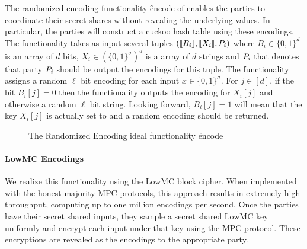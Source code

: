 The randomized encoding functionality \f{encode} of  enables the parties to coordinate their secret shares without revealing the underlying values. In particular, the parties will construct a cuckoo hash table using these encodings. The functionality takes as input several tuples $(\llbracket B_i\rrbracket,\llbracket X_i\rrbracket,P_{i})$ where $B_i\in\{0,1\}^d$ is an array of $d$ bits, $ X_i\in(\{0,1\}^\sigma)^{d}$ is a array of $d$ strings and  $P_{i}$ that denotes that party $P_{i}$ should be output the encodings for this tuple. The functionality assigns a random $\ell$ bit encoding for each input $x\in \{0,1\}^\sigma$. For $j\in[d]$, if the bit $B_i[j]=0$ then the functionality outputs the encoding for $X_i[j]$ and otherwise a random $\ell$ bit string. Looking forward, $B_i[j]=1$ will mean that the key $X_i[j]$ is actually set to \Null and a random encoding should be returned.



\begin{figure}[ht]
\vspace{-0.3cm}
	\caption{The Randomized Encoding ideal functionality \f{encode}}
	\label{fig:randomized-encode-ideal}	
	\vspace{-0.3cm}
\end{figure}


\paragraph{LowMC Encodings}
We realize this functionality using the LowMC block cipher\cite{lowmc}. When implemented with the honest majority MPC protocols\cite{highthroughput}, this approach results in extremely high throughput, computing up to one million encodings per second. Once the parties have their secret shared inputs, they sample a secret shared LowMC key uniformly and encrypt each input under that key using the MPC protocol. These encryptions are revealed as the encodings to the appropriate party.


